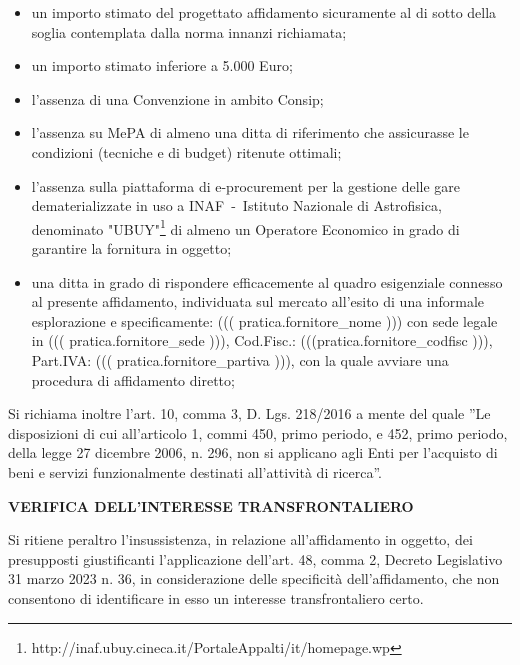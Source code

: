 \begin{itemize}

\item un importo stimato del progettato affidamento sicuramente al di sotto
della soglia contemplata dalla norma innanzi richiamata;

\item un importo stimato inferiore a 5.000 Euro;

\item l’assenza di una Convenzione in ambito Consip;

\item l'assenza su MePA di almeno una ditta di riferimento che assicurasse
le condizioni (tecniche e di budget) ritenute ottimali;

\item l'assenza sulla piattaforma di e-procurement
per la gestione delle gare dematerializzate in uso a
INAF~-~Istituto Nazionale di Astrofisica, denominato
"UBUY"\footnote{http://inaf.ubuy.cineca.it/PortaleAppalti/it/homepage.wp}
di almeno un Operatore Economico in grado di garantire la fornitura in oggetto;

\item una ditta in grado di rispondere efficacemente al quadro esigenziale
connesso al presente affidamento, individuata sul mercato all’esito di
una informale esplorazione e specificamente:
((( pratica.fornitore_nome ))) con sede legale in ((( pratica.fornitore_sede ))),
Cod.Fisc.: (((pratica.fornitore_codfisc ))), Part.IVA: ((( pratica.fornitore_partiva ))),
con la quale avviare una procedura di affidamento diretto;

\end{itemize}

Si richiama inoltre l’art. 10, comma 3, D. Lgs. 218/2016 a mente
del quale ''Le disposizioni di cui all'articolo 1, commi 450, primo
periodo, e 452, primo periodo, della legge 27 dicembre 2006, n. 296, non
si applicano agli Enti per l'acquisto di beni e servizi funzionalmente
destinati all'attività di ricerca''.



\textbf{VERIFICA DELL’INTERESSE TRANSFRONTALIERO}

Si ritiene peraltro l’insussistenza, in relazione all’affidamento in
oggetto, dei presupposti giustificanti l’applicazione dell’art. 48,
comma 2, Decreto Legislativo 31 marzo 2023 n. 36, in considerazione delle
specificità dell’affidamento, che non consentono di identificare in
esso un interesse transfrontaliero certo. 

